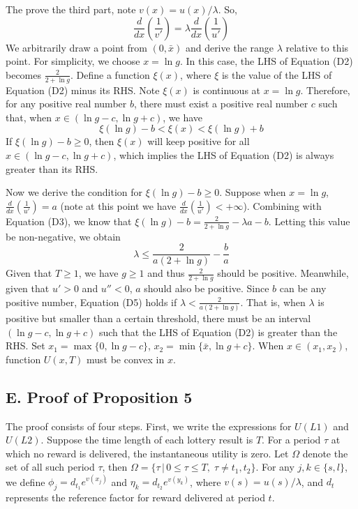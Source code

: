 \documentclass[
  12pt,
]{article}
\begin{document}
The prove the third part, note \(v(x)=u(x)/\lambda\). So, \[
\frac{d}{dx}\left(\frac{1}{v'}\right)=\lambda\frac{d}{dx}\left(\frac{1}{u'}\right)
\]We arbitrarily draw a point from \((0,\bar{x})\) and derive the range
\(\lambda\) relative to this point. For simplicity, we choose
\(x=\ln g\). In this case, the LHS of Equation (D2) becomes
\(\frac{2}{2+\ln g}\). Define a function \(\xi(x)\), where \(\xi\) is
the value of the LHS of Equation (D2) minus its RHS. Note \(\xi(x)\) is
continuous at \(x=\ln g\). Therefore, for any positive real number
\(b\), there must exist a positive real number \(c\) such that, when
\(x\in(\ln g-c,\ln g+c)\), we have\[\tag{D4}
\xi(\ln g)-b<\xi(x)<\xi(\ln g)+b
\]If \(\xi(\ln g)-b\geq 0\), then \(\xi(x)\) will keep positive for all
\(x\in(\ln g-c,\ln g+c)\), which implies the LHS of Equation (D2) is
always greater than its RHS.

Now we derive the condition for \(\xi(\ln g)-b\geq 0\). Suppose when
\(x=\ln g\), \(\frac{d}{dx}\left(\frac{1}{u'}\right)=a\) (note at this
point we have \(\frac{d}{dx}\left(\frac{1}{u'}\right)<+\infty\)).
Combining with Equation (D3), we know that
\(\xi(\ln g)-b =\frac{2}{2+\ln g}-\lambda a-b\). Letting this value be
non-negative, we obtain\[\tag{D5}
\lambda \leq \frac{2}{a(2+\ln g)}-\frac{b}{a}
\]Given that \(T\geq1\), we have \(g\geq 1\) and thus
\(\frac{2}{2+\ln g}\) should be positive. Meanwhile, given that \(u'>0\)
and \(u''<0\), \(a\) should also be positive. Since \(b\) can be any
positive number, Equation (D5) holds if
\(\lambda <\frac{2}{a(2+\ln g)}\). That is, when \(\lambda\) is positive
but smaller than a certain threshold, there must be an interval
\((\ln g-c,\ln g+c)\) such that the LHS of Equation (D2) is greater than
the RHS. Set \(x_1 = \max\{0,\ln g-c\}\),
\(x_2=\min\{\bar{x}, \ln g +c\}\). When \(x\in (x_1,x_2)\), function
\(U(x,T)\) must be convex in \(x\).

\hypertarget{e.-proof-of-proposition-5}{%
\subsection*{E. Proof of Proposition
5}\label{e.-proof-of-proposition-5}}

The proof consists of four steps. First, we write the expressions for
\(U(L1)\) and \(U(L2)\). Suppose the time length of each lottery result
is \(T\). For a period \(\tau\) at which no reward is delivered, the
instantaneous utility is zero. Let \(\Omega\) denote the set of all such
period \(\tau\), then
\(\Omega=\{\tau\,|\,0\leq\tau\leq T,\;\tau \neq t_1,t_2\}\). For any
\(j,k\in\{s,l\}\), we define \(\phi_j=d_{t_1}e^{v(x_j)}\) and
\(\eta_k=d_{t_2}e^{v(y_k)}\), where \(v(s)=u(s)/\lambda\), and \(d_t\)
represents the reference factor for reward delivered at period \(t\).
\end{document}
